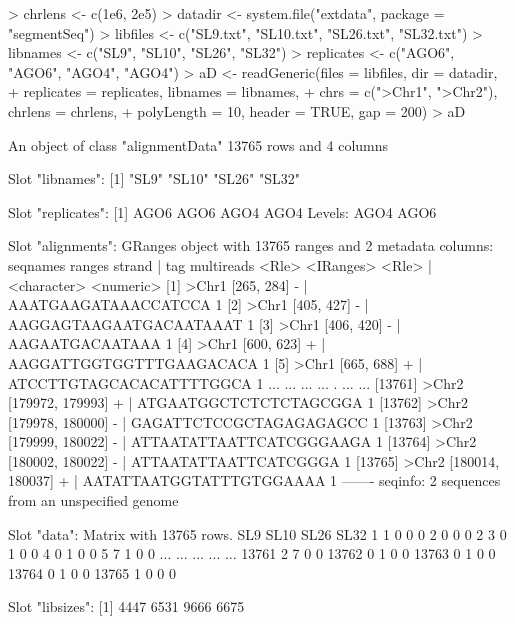 \documentclass[a4paper]{article}
\begin{document}
\begin{Schunk}
\begin{Sinput}
> chrlens <- c(1e6, 2e5)
> datadir <- system.file("extdata", package = "segmentSeq")
> libfiles <- c("SL9.txt", "SL10.txt", "SL26.txt", "SL32.txt")
> libnames <- c("SL9", "SL10", "SL26", "SL32")
> replicates <- c("AGO6", "AGO6", "AGO4", "AGO4")
> aD <- readGeneric(files = libfiles, dir = datadir,
+                   replicates = replicates, libnames = libnames, 
+                   chrs = c(">Chr1", ">Chr2"), chrlens = chrlens,
+                   polyLength = 10, header = TRUE, gap = 200)
> aD
\end{Sinput}
\begin{Soutput}
An object of class "alignmentData"
13765 rows and 4 columns

Slot "libnames":
[1] "SL9"  "SL10" "SL26" "SL32"

Slot "replicates":
[1] AGO6 AGO6 AGO4 AGO4
Levels: AGO4 AGO6

Slot "alignments":
GRanges object with 13765 ranges and 2 metadata columns:
          seqnames           ranges strand |                      tag multireads
             <Rle>        <IRanges>  <Rle> |              <character>  <numeric>
      [1]    >Chr1       [265, 284]      - |     AAATGAAGATAAACCATCCA          1
      [2]    >Chr1       [405, 427]      - |  AAGGAGTAAGAATGACAATAAAT          1
      [3]    >Chr1       [406, 420]      - |          AAGAATGACAATAAA          1
      [4]    >Chr1       [600, 623]      + | AAGGATTGGTGGTTTGAAGACACA          1
      [5]    >Chr1       [665, 688]      + | ATCCTTGTAGCACACATTTTGGCA          1
      ...      ...              ...    ... .                      ...        ...
  [13761]    >Chr2 [179972, 179993]      + |   ATGAATGGCTCTCTCTAGCGGA          1
  [13762]    >Chr2 [179978, 180000]      - |  GAGATTCTCCGCTAGAGAGAGCC          1
  [13763]    >Chr2 [179999, 180022]      - | ATTAATATTAATTCATCGGGAAGA          1
  [13764]    >Chr2 [180002, 180022]      - |    ATTAATATTAATTCATCGGGA          1
  [13765]    >Chr2 [180014, 180037]      + | AATATTAATGGTATTTGTGGAAAA          1
  -------
  seqinfo: 2 sequences from an unspecified genome

Slot "data":
Matrix with  13765  rows.
      SL9 SL10 SL26 SL32
1       1    0    0    0
2       0    0    0    2
3       0    1    0    0
4       0    1    0    0
5       7    1    0    0
...   ...  ...  ...  ...
13761   2    7    0    0
13762   0    1    0    0
13763   0    1    0    0
13764   0    1    0    0
13765   1    0    0    0

Slot "libsizes":
[1] 4447 6531 9666 6675
\end{Soutput}
\end{Schunk}
\end{document}

